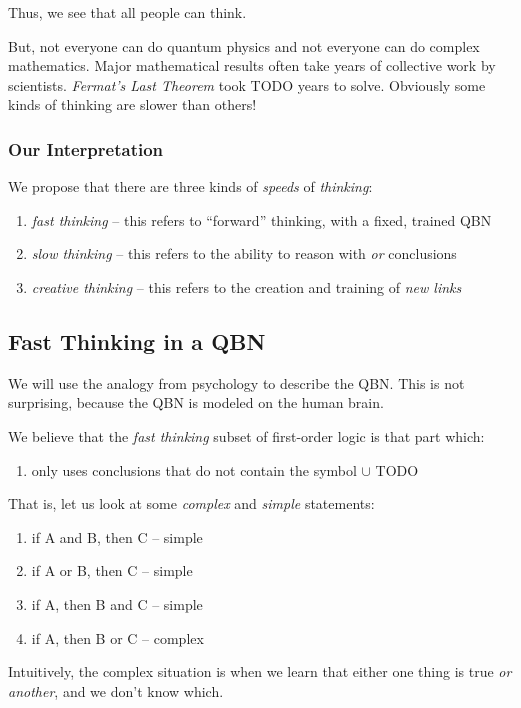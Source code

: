 \documentclass[12pt]{article}
\begin{document}
Thus, we see that all people can think.


But, not everyone can do quantum physics and not everyone can do complex mathematics.
Major mathematical results often take years of collective work by scientists.
{\em Fermat's Last Theorem} took TODO years to solve.
Obviously some kinds of thinking are slower than others!

\subsubsection{Our Interpretation}
We propose that there are three kinds of {\em speeds} of {\em thinking}:
\begin{enumerate}
    \item {\em fast thinking} -- this refers to ``forward'' thinking, with a fixed, trained QBN
    \item {\em slow thinking} -- this refers to the ability to reason with {\em or} conclusions
    \item {\em creative thinking} -- this refers to the creation and training of {\em new links}
\end{enumerate}

\subsection{Fast Thinking in a QBN}
We will use the analogy from psychology to describe the QBN.
This is not surprising, because the QBN is modeled on the human brain.

We believe that the {\em fast thinking} subset of first-order logic is that part which:
\begin{enumerate}
    \item only uses conclusions that do not contain the symbol $\cup$ TODO
\end{enumerate}

That is, let us look at some {\em complex} and {\em simple} statements:
\begin{enumerate}
    \item if A and B, then C -- simple
    \item if A or B, then C -- simple
    \item if A, then B and C -- simple
    \item if A, then B or C -- complex
\end{enumerate}

Intuitively, the complex situation is when we learn that either one thing is true {\em or another}, and we don't know which.
\end{document}
